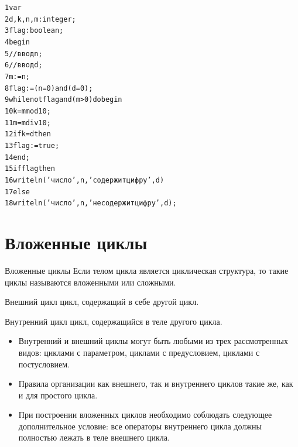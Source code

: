 \documentclass{beamer}
\begin{document}
\begin{frame}[fragile]
\begin{alltt}
1 var  
2   d, k, n, m: integer;
3   flag: boolean;
4 begin
5   //ввод n; 
6   //ввод d;
7   m := n;
8   flag := (n=0) and (d=0);
9   while not flag and (m > 0) do begin
10    k = m mod 10;
11    m = m div 10;
12    if k = d then 
13       flag := true;
14  end;
15  if flag then
16    writeln('число ', n, ' содержит цифру ', d)
17  else
18    writeln('число ', n, ' не содержит цифру ', d);
\end{alltt}
\end{frame}

\section{Вложенные циклы}

\begin{frame}{Вложенные циклы}
Если телом цикла является циклическая структура, то такие циклы называются вложенными или сложными.
\begin{block}{Внешний цикл}
цикл, содержащий в себе другой цикл.
\end{block}
\begin{block}{Внутренний цикл}
цикл, содержащийся в теле другого цикла.
\end{block}
\begin{itemize}
\item Внутренний и внешний циклы могут быть любыми из трех рассмотренных видов: циклами с параметром, циклами с предусловием, циклами с постусловием. 
\item Правила организации как внешнего, так и внутреннего циклов такие же, как и для простого цикла.
\item При построении вложенных циклов необходимо соблюдать следующее дополнительное условие: все операторы внутреннего цикла должны полностью лежать в теле внешнего цикла.
\end{itemize}
\end{frame}
\end{document}

